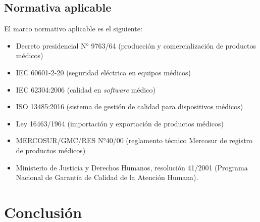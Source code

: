 \documentclass[
    11pt,
    spanish,
	a4paper
]{article}
\begin{document}
\subsection{Normativa aplicable}
\label{subsec:normativa}

El marco normativo aplicable es el siguiente:

\begin{itemize}
    \item Decreto presidencial N° 9763/64 (producción y comercialización de productos médicos)
    \item IEC 60601-2-20 (seguridad eléctrica en equipos médicos)
    \item IEC 62304:2006 (calidad en \emph{software} médico)
    \item ISO 13485:2016 (sistema de gestión de calidad para dispositivos médicos)
    \item Ley 16463/1964 (importación y exportación de productos médicos)
    \item MERCOSUR/GMC/RES N°40/00 (reglamento técnico Mercosur de registro de productos médicos)
    \item Ministerio de Justicia y Derechos Humanos, resolución 41/2001 (Programa Nacional de Garantía de Calidad de la Atención Humana).
\end{itemize}

\section{Conclusión}
\label{suc:conclusion}
\end{document}
